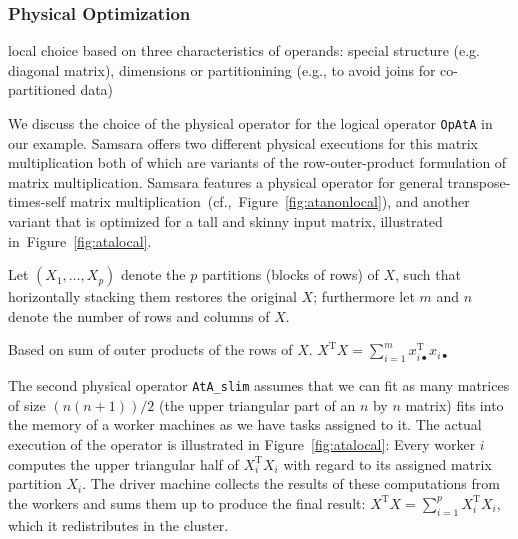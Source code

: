 \documentclass{article}
\begin{document}
\subsubsection{Physical Optimization}

local choice based on three characteristics of operands: special structure (e.g. diagonal matrix), dimensions or partitionining (e.g., to avoid joins for co-partitioned data)

We discuss the choice of the physical operator for the logical operator \texttt{OpAtA} in our example. Samsara offers two different physical executions for this matrix multiplication both of which are variants of the row-outer-product formulation of matrix multiplication. Samsara features a physical operator for general transpose-times-self matrix multiplication~(cf.,~Figure~\ref{fig:atanonlocal}), and another variant that is optimized for a tall and skinny input matrix, illustrated in~Figure~\ref{fig:atalocal}.

Let $(X_1,\dots,X_p)$ denote the $p$ partitions (blocks of rows) of $X$, such that horizontally stacking them restores the original $X$; furthermore let $m$ and $n$ denote the number of rows and columns of $X$.

Based on sum of outer products of the rows of $X$. $X^\mathrm{T}X = \sum_{i=1}^{m} x_{i\bullet}^\mathrm{T} x_{i\bullet}$ 

The second physical operator \texttt{AtA\_slim} assumes that we can fit as many matrices of size $(n(n+1))/2$ (the upper triangular part of an $n$ by $n$ matrix) fits into the memory of a worker machines as we have tasks assigned to it. The actual execution of the operator is illustrated in Figure~\ref{fig:atalocal}: Every worker $i$ computes the upper triangular half of $X_i^\mathrm{T}X_i$ with regard to its assigned matrix partition $X_i$. The driver machine collects the results of these computations from the workers and sums them up to produce the final result: $X^\mathrm{T}X = \sum_{i = 1}^{p} X_i^\mathrm{T}X_i$, which it redistributes in the cluster.
\end{document}
